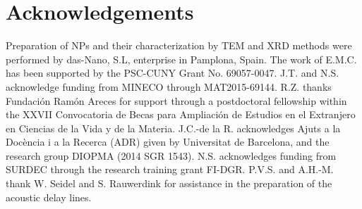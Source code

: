 \documentclass[aps,prb,floats,twocolumn]{revtex4}
\begin{document}
\section{Acknowledgements}
Preparation of NPs and their characterization by TEM and XRD methods were performed by das-Nano, S.L, enterprise in Pamplona, Spain. The work of E.M.C. has been supported by the PSC-CUNY Grant No. 69057-0047. J.T. and N.S. acknowledge funding from MINECO through MAT2015-69144. R.Z. thanks Fundaci\'{o}n Ram\'{o}n Areces for support through a postdoctoral fellowship within the XXVII Convocatoria de Becas para Ampliaci\'{o}n de Estudios en el Extranjero en Ciencias de la Vida y de la Materia. J.C.-de la R. acknowledges Ajuts a la Doc\`{e}ncia i a la Recerca (ADR) given by Universitat de Barcelona, and the research group DIOPMA (2014 SGR 1543). N.S. acknowledges funding from SURDEC through the research training grant FI-DGR. P.V.S. and A.H.-M. thank W. Seidel and S. Rauwerdink for assistance in the preparation of the acoustic delay lines.
\end{document}
